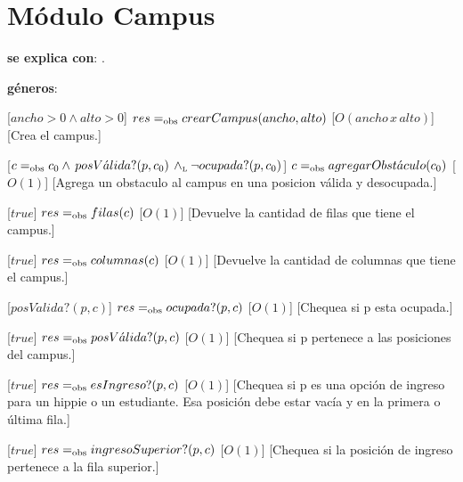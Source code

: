 \section{Módulo Campus}

\begin{Interfaz}

  \textbf{se explica con}: .\par
  \textbf{géneros}: 

    

  [$ancho > 0 \land alto > 0$]
  {$res =_{\mathrm{obs}} crearCampus(ancho,alto)$}
  [$O(ancho\,x\,alto)$]
  [Crea el campus.]
  
  [$c =_{\mathrm{obs}} c_{0} \land \, posV\acute{a}lida?(p,c_{0}) \, \land_{\mathrm{\scriptscriptstyle{L}}} \neg ocupada?(p,c_{0})$]
  {$c =_{\mathrm{obs}} agregarObst\acute{a}culo(c_{0})$}
  [$O(1)$]
  [Agrega un obstaculo al campus en una posicion válida y desocupada.]

  
  [$true$]
  {$res =_{\mathrm{obs}} filas(c)$}
  [$O(1)$]
  [Devuelve la cantidad de filas que tiene el campus.]  
  
  [$true$]
  {$res =_{\mathrm{obs}} columnas(c)$}
  [$O(1)$]
  [Devuelve la cantidad de columnas que tiene el campus.]  
  
  [$posV\acute{a}lida?(p,c)$]
  {$res =_{\mathrm{obs}} ocupada?(p,c)$}
  [$O(1)$]
  [Chequea si p esta ocupada.]  


  [$true$]
  {$res =_{\mathrm{obs}} posV\acute{a}lida?(p,c)$}
  [$O(1)$]
  [Chequea si p pertenece a las posiciones del campus.]
  
  [$true$]
  {$res =_{\mathrm{obs}} esIngreso?(p,c)$}
  [$O(1)$]
  [Chequea si p es una opción de ingreso para un hippie o un estudiante. Esa posición debe estar vacía y en la primera o última fila.]
  
  [$true$]
  {$res =_{\mathrm{obs}} ingresoSuperior?(p,c)$}
  [$O(1)$]
  [Chequea si la posición de ingreso pertenece a la fila superior.]
  

\end{Interfaz}
